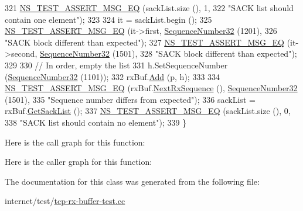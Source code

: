 \begin{DoxyCode}
321   \hyperlink{group__testing_ga2a9d78cffb3db8e867c35fff0b698cf5}{NS\_TEST\_ASSERT\_MSG\_EQ} (sackList.size (), 1,
322                          \textcolor{stringliteral}{"SACK list should contain one element"});
323 
324   it = sackList.begin ();
325   \hyperlink{group__testing_ga2a9d78cffb3db8e867c35fff0b698cf5}{NS\_TEST\_ASSERT\_MSG\_EQ} (it->first, \hyperlink{classns3_1_1SequenceNumber}{SequenceNumber32} (1201),
326                          \textcolor{stringliteral}{"SACK block different than expected"});
327   \hyperlink{group__testing_ga2a9d78cffb3db8e867c35fff0b698cf5}{NS\_TEST\_ASSERT\_MSG\_EQ} (it->second, \hyperlink{classns3_1_1SequenceNumber}{SequenceNumber32} (1501),
328                          \textcolor{stringliteral}{"SACK block different than expected"});
329 
330   \textcolor{comment}{// In order, empty the list}
331   h.SetSequenceNumber (\hyperlink{classns3_1_1SequenceNumber}{SequenceNumber32} (1101));
332   rxBuf.\hyperlink{classns3_1_1TcpRxBuffer_a35a036383b8976cb79738c28aa01d5d0}{Add} (p, h);
333 
334   \hyperlink{group__testing_ga2a9d78cffb3db8e867c35fff0b698cf5}{NS\_TEST\_ASSERT\_MSG\_EQ} (rxBuf.\hyperlink{classns3_1_1TcpRxBuffer_ae994bf90329d10f17b59d32907b04ca9}{NextRxSequence} (), 
      \hyperlink{group__network_gacb2070e4e98d2d5135c9bede58f07a03}{SequenceNumber32} (1501),
335                          \textcolor{stringliteral}{"Sequence number differs from expected"});
336   sackList = rxBuf.\hyperlink{classns3_1_1TcpRxBuffer_afc5d672da4595330754de1bb3933a9c7}{GetSackList} ();
337   \hyperlink{group__testing_ga2a9d78cffb3db8e867c35fff0b698cf5}{NS\_TEST\_ASSERT\_MSG\_EQ} (sackList.size (), 0,
338                          \textcolor{stringliteral}{"SACK list should contain no element"});
339 \}
\end{DoxyCode}


Here is the call graph for this function\+:




Here is the caller graph for this function\+:




The documentation for this class was generated from the following file\+:\begin{DoxyCompactItemize}
\item 
internet/test/\hyperlink{tcp-rx-buffer-test_8cc}{tcp-\/rx-\/buffer-\/test.\+cc}\end{DoxyCompactItemize}

